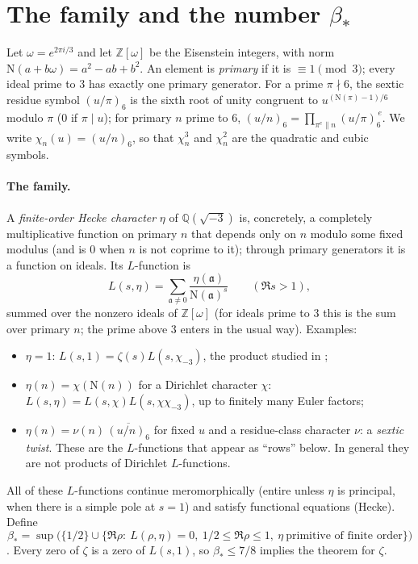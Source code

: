 \documentclass[11pt]{article}
\newcommand{\OO}{\mathbb Z[\omega]}
\newcommand{\N}{\mathrm N}
\newcommand{\ch}{\chi_{-3}}
\begin{document}
\section{The family and the number \texorpdfstring{$\beta_*$}{beta*}}\label{sec:family}

Let $\omega=e^{2\pi i/3}$ and let $\OO$ be the Eisenstein integers, with
norm $\N(a+b\omega)=a^2-ab+b^2$. An element is \emph{primary} if it is
$\equiv1\pmod 3$; every ideal prime to $3$ has exactly one primary
generator. For a prime $\pi\nmid6$, the sextic residue symbol $(u/\pi)_6$ is the sixth
root of unity congruent to $u^{(\N(\pi)-1)/6}$ modulo $\pi$ ($0$ if $\pi\mid u$);
for primary $n$ prime to $6$, $(u/n)_6=\prod_{\pi^e\parallel n}(u/\pi)_6^{\,e}$. We write $\chi_n(u)=(u/n)_6$, so that $\chi_n^3$ and
$\chi_n^2$ are the quadratic and cubic symbols.

\paragraph{The family.} A \emph{finite-order Hecke character} $\eta$ of
$\mathbb Q(\sqrt{-3})$ is, concretely, a completely multiplicative function on
primary $n$ that depends only on $n$ modulo some fixed modulus (and is
$0$ when $n$ is not coprime to it); through primary generators it is a function
on ideals. Its $L$-function is
\[
 L(s,\eta)=\sum_{\mathfrak a\ne0}\frac{\eta(\mathfrak a)}{\N(\mathfrak a)^s}
 \qquad(\Re s>1),
\]
summed over the nonzero ideals of $\OO$ (for ideals prime to $3$ this is the sum
over primary $n$; the prime above $3$ enters in the usual way). Examples:
\begin{itemize}
\item $\eta=1$: $L(s,1)=\zeta(s)L(s,\ch)$, the product studied in
 \cite{guide1112};
\item $\eta(n)=\chi(\N(n))$ for a Dirichlet character $\chi$:
 $L(s,\eta)=L(s,\chi)L(s,\chi\ch)$, up to finitely many Euler factors;
\item $\eta(n)=\nu(n)\,\overline{(u/n)_6}$ for fixed $u$ and a
 residue-class character $\nu$: a \emph{sextic twist}. These are the
 $L$-functions that appear as ``rows'' below. In general they are not products of
 Dirichlet $L$-functions.
\end{itemize}
All of these $L$-functions continue meromorphically (entire unless $\eta$ is
principal, when there is a simple pole at $s=1$) and satisfy functional
equations (Hecke). Define
\begin{equation}\label{eq:betastar}
 \beta_*=\sup\bigl(\{1/2\}\cup\{\Re\rho:\ L(\rho,\eta)=0,\
 1/2\le\Re\rho\le1,\ \eta\ \text{primitive of finite order}\}\bigr)
\end{equation}
\cite[L378--385]{OAI78}. Every zero of $\zeta$ is a zero of $L(s,1)$, so
$\beta_*\le7/8$ implies the theorem for $\zeta$.
\end{document}
